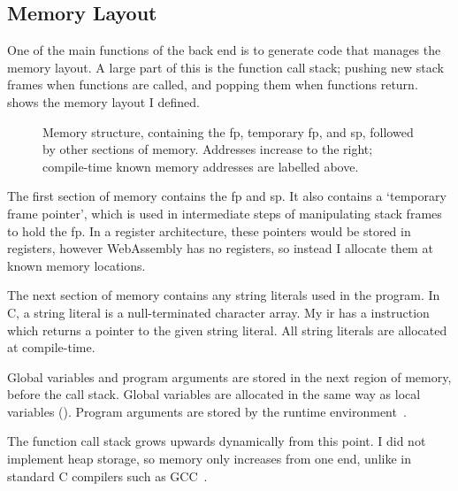 \documentclass[00-main.tex]{subfiles}
\begin{document}

\subsection{Memory Layout}

One of the main functions of the back end is to generate code that manages the memory layout.
A large part of this is the function call stack; pushing new stack frames when functions are called, and popping them when functions return.
 shows the memory layout I defined.

\begin{figure}[t]
  \centering
  \caption{\protect{}\protect{}%
    Memory structure, containing the \gls{fp}, temporary \acrlong{fp}, and \gls{sp}, followed by other sections of memory.
    Addresses increase to the right; compile-time known memory addresses are labelled above.
  }%
  \label{fig:memory structure}
\end{figure}


The first section of memory contains the \gls{fp} and \gls{sp}.
It also contains a `temporary frame pointer', which is used in intermediate steps of manipulating stack frames to hold the \gls{fp}.
In a register architecture, these pointers would be stored in registers, however WebAssembly has no registers, so instead I allocate them at known memory locations.

The next section of memory contains any string literals used in the program.
In C, a string literal is a null-terminated character array.
My \gls{ir} has a  instruction which returns a pointer to the given string literal.
All string literals are allocated at compile-time.

Global variables and program arguments are stored in the next region of memory, before the call stack.
Global variables are allocated in the same way as local variables ().
Program arguments are stored by the runtime environment~.

The function call stack grows upwards dynamically from this point.
I did not implement heap storage, so memory only increases from one end, unlike in standard C compilers such as GCC~.
\end{document}
